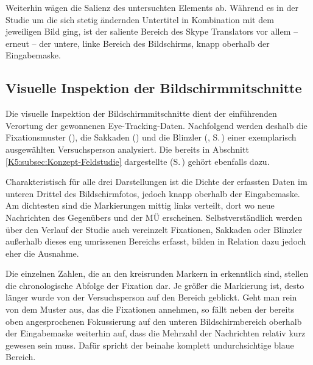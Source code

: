 Weiterhin wägen \citet[414\psq]{bisson_processing_2014} die Salienz des untersuchten Elements ab. Während es in der Studie um die sich stetig ändernden Untertitel in Kombination mit dem jeweiligen Bild ging, ist der saliente Bereich des Skype Translators vor allem -- erneut -- der untere, linke Bereich des Bildschirms, knapp oberhalb der Eingabemaske.


\subsection{Visuelle Inspektion der Bildschirmmitschnitte}

\label{K6:sub:catde:graph-inspect}


Die visuelle Inspektion der Bildschirmmitschnitte dient der einführenden Verortung der gewonnenen Eye-Tracking-Daten. Nachfolgend werden deshalb die Fixationsmuster (), die Sakkaden () und die Blinzler (, S.\,\pageref{K6:fig:blinks-TN24}) einer exemplarisch ausgewählten Versuchsperson analysiert. Die bereits in Abschnitt \ref{K5:subsec:Konzept-Feldstudie} dargestellte  (S.\,\pageref{K5:fig:Heatmap-TN24}) gehört ebenfalls dazu.\pagebreak

Charakteristisch für alle drei Darstellungen ist die Dichte der erfassten Daten im unteren Drittel des Bildschirmfotos, jedoch knapp oberhalb der Eingabemaske. Am dichtesten sind die Markierungen mittig links verteilt, dort wo neue Nachrichten des Gegenübers und der MÜ erscheinen. Selbstverständlich werden über den Verlauf der Studie auch vereinzelt Fixationen, Sakkaden oder Blinzler außerhalb dieses eng umrissenen Bereichs erfasst, bilden in Relation dazu jedoch eher die Ausnahme.

Die einzelnen Zahlen, die an den kreisrunden Markern in  erkenntlich sind, stellen die chronologische Abfolge der Fixation dar. Je größer die Markierung ist, desto länger wurde von der Versuchsperson auf den Bereich geblickt. Geht man rein von dem Muster aus, das die Fixationen annehmen, so fällt neben der bereits oben angesprochenen Fokussierung auf den unteren Bildschirmbereich oberhalb der Eingabemaske weiterhin auf, dass die Mehrzahl der Nachrichten relativ kurz gewesen sein muss. Dafür spricht der beinahe komplett undurchsichtige blaue Bereich.

